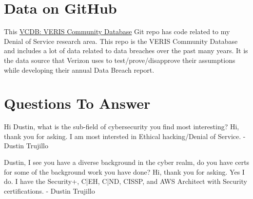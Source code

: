 \documentclass[a4paper]{article}
\begin{document}
\section{Data on GitHub}
This \href{https://github.com/vz-risk/VCDB}{VCDB: VERIS Community Database} Git repo has code related to my Denial of Service research area. This repo is the VERIS Community Database and includes a lot of data related to data breaches over the past many years. It is the data source that Verizon uses to test/prove/disapprove their assumptions while developing their annual Data Breach report.

\section{Questions To Answer}
Hi Dustin, what is the sub-field of cybersecurity you find most interesting?
Hi, thank you for asking. I am most intersted in Ethical hacking/Denial of Service. - Dustin Trujillo

Dustin, I see you have a diverse background in the cyber realm, do you have certs for some of the background work you have done?
Hi, thank you for asking. Yes I do. I have the Security+, C|EH, C|ND, CISSP, and AWS Architect with Security certifications. - Dustin Trujillo
\end{document}
